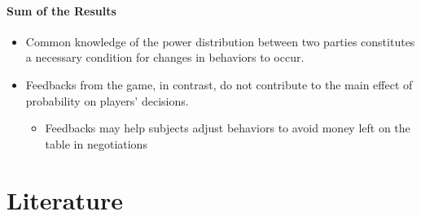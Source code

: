\documentclass[../root]{subfiles}
\begin{document}
    \paragraph{Sum of the Results}

    \begin{itemize}
      \item Common knowledge of the power distribution between two parties constitutes a necessary condition for changes in behaviors to occur.
      \item Feedbacks from the game, in contrast, do not contribute to the main effect of probability on players’ decisions.
      \begin{itemize}
        \item Feedbacks may help subjects adjust behaviors to avoid money left on the table in negotiations
      \end{itemize}
    \end{itemize}

    \section{Literature}
\end{document}
